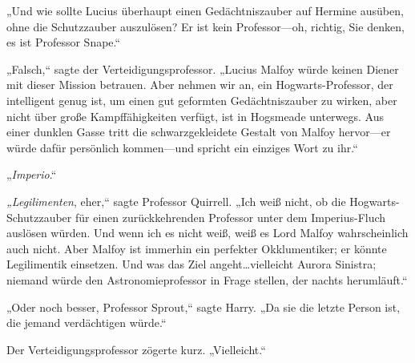 „Und wie sollte Lucius überhaupt einen Gedächtniszauber auf Hermine ausüben, ohne die Schutzzauber auszulösen? Er ist kein Professor—oh, richtig, Sie denken, es ist Professor Snape.“

„Falsch,“ sagte der Verteidigungsprofessor. „Lucius Malfoy würde keinen Diener mit dieser Mission betrauen. Aber nehmen wir an, ein Hogwarts-Professor, der intelligent genug ist, um einen gut geformten Gedächtniszauber zu wirken, aber nicht über große Kampffähigkeiten verfügt, ist in Hogsmeade unterwegs. Aus einer dunklen Gasse tritt die schwarzgekleidete Gestalt von Malfoy hervor—er würde dafür persönlich kommen—und spricht ein einziges Wort zu ihr.“

„\emph{Imperio}.“

\emph{„Legilimenten}, eher,“ sagte Professor Quirrell. „Ich weiß nicht, ob die Hogwarts-Schutzzauber für einen zurückkehrenden Professor unter dem Imperius-Fluch auslösen würden. Und wenn ich es nicht weiß, weiß es Lord Malfoy wahrscheinlich auch nicht. Aber Malfoy ist immerhin ein perfekter Okklumentiker; er könnte Legilimentik einsetzen. Und was das Ziel angeht…vielleicht Aurora Sinistra; niemand würde den Astronomieprofessor in Frage stellen, der nachts herumläuft.“

„Oder noch besser, Professor Sprout,“ sagte Harry. „Da sie die letzte Person ist, die jemand verdächtigen würde.“

Der Verteidigungsprofessor zögerte kurz. „Vielleicht.“

